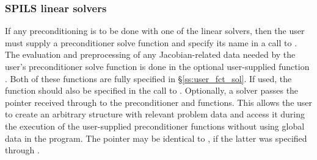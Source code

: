 \subsubsection{SPILS linear solvers}\label{sss:optin_spils}
If any preconditioning is to be done with one of the {\kinspils} linear
solvers, then the user must supply a preconditioner solve function 
and specify its name in a call to .
The evaluation and preprocessing of any Jacobian-related data needed
by the user's preconditioner solve function is done in the optional
user-supplied function . Both of these functions are
fully specified in \S\ref{ss:user_fct_sol}.
If used, the  function should also be specified in the call to
.
Optionally, a {\kinspils} solver passes the pointer 
received through  to the preconditioner
 and  functions.  This allows the user to create
an arbitrary structure with relevant problem data and access it during
the execution of the user-supplied preconditioner functions without using
global data in the program.  The pointer  may be identical
to , if the latter was specified through .


